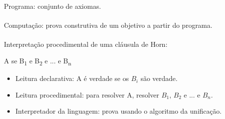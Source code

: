 \documentclass[../resumosPLOG.tex]{subfiles}
\begin{document}
 

Programa: conjunto de axiomas.

\paragraph{}

Computação: prova construtiva de um objetivo a partir do programa.

\paragraph{}

Interpretação procedimental de uma cláusula de Horn: 

\quad A se B\textsubscript{1} e B\textsubscript{2} e ... e B\textsubscript{n}
\begin{itemize}
    \item Leitura declarativa: A é verdade se os \(B_i\) são verdade.
    \item Leitura procedimental: para resolver A, resolver \(B_1\), \(B_2\) e ... e \(B_n\).
    \item Interpretador da linguagem: prova usando o algoritmo da unificação.
\end{itemize}
\end{document}
